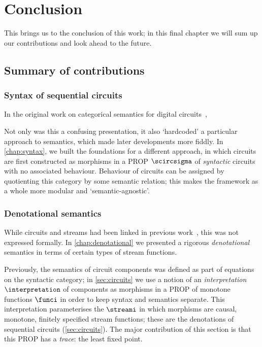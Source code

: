 \chapter{Conclusion}

This brings us to the conclusion of this work; in this final chapter we will sum
up our contributions and look ahead to the future.

\section{Summary of contributions}

\subsection{Syntax of sequential circuits}

In the original work on categorical semantics for digital
circuits~\cite{ghica2016categorical},

Not only was this a confusing presentation, it also `hardcoded' a particular
approach to semantics, which made later developments more fiddly.
In \cref{chap:syntax}, we built the foundations for a different approach, in
which circuits are first constructed as morphisms in a PROP \(\scircsigma\) of
\emph{syntactic} circuits with no associated behaviour.
Behaviour of circuits can be assigned by quotienting this category by some
semantic relation; this makes the framework as a whole more modular and
`semantic-agnostic'.

\subsection{Denotational semantics}

While circuits and streams had been linked in previous
work~\cite{ghica2017diagrammatica}, this was not expressed formally.
In \cref{chap:denotational} we presented a rigorous \emph{denotational}
semantics in terms of certain types of stream functions.

Previously, the semantics of circuit components was defined as part of
equations on the syntactic category; in \cref{sec:circuits} we use a notion of
an \emph{interpretation} \(\interpretation\) of components as morphisms in a
PROP of monotone functions \(\funci\) in order to keep syntax and semantics
separate.
This interpretation parameterises the \(\streami\) in which morphisms are
causal, monotone, finitely specified stream functions; these are the denotations
of sequential circuits (\cref{sec:circuits}).
The major contribution of this section is that this PROP has a \emph{trace}: the
least fixed point.

